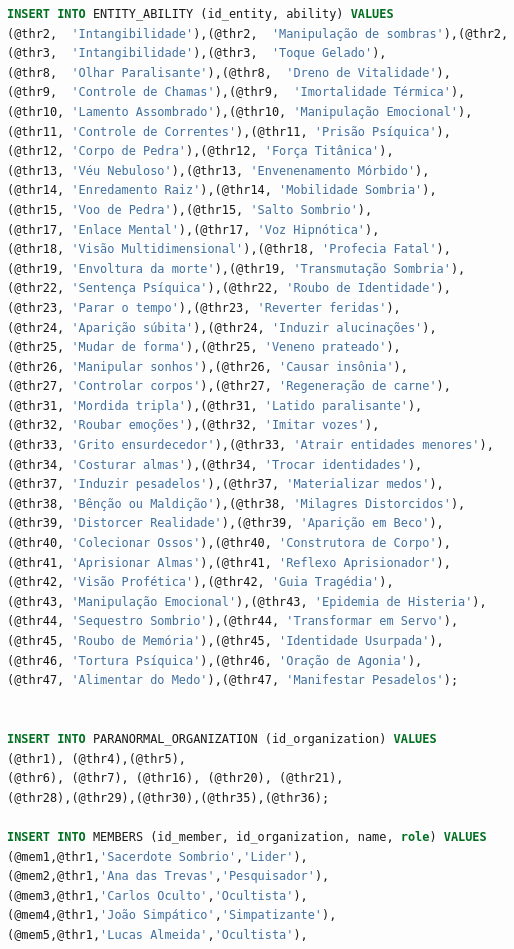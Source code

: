 \documentclass[12pt,a4paper]{report}
\begin{document}
\begin{lstlisting}[language=SQL, caption=population.sql]
INSERT INTO ENTITY_ABILITY (id_entity, ability) VALUES
(@thr2,  'Intangibilidade'),(@thr2,  'Manipulação de sombras'),(@thr2,  'Aura Sombria'),
(@thr3,  'Intangibilidade'),(@thr3,  'Toque Gelado'),
(@thr8,  'Olhar Paralisante'),(@thr8,  'Dreno de Vitalidade'),
(@thr9,  'Controle de Chamas'),(@thr9,  'Imortalidade Térmica'),
(@thr10, 'Lamento Assombrado'),(@thr10, 'Manipulação Emocional'),
(@thr11, 'Controle de Correntes'),(@thr11, 'Prisão Psíquica'),
(@thr12, 'Corpo de Pedra'),(@thr12, 'Força Titânica'),
(@thr13, 'Véu Nebuloso'),(@thr13, 'Envenenamento Mórbido'),
(@thr14, 'Enredamento Raiz'),(@thr14, 'Mobilidade Sombria'),
(@thr15, 'Voo de Pedra'),(@thr15, 'Salto Sombrio'),
(@thr17, 'Enlace Mental'),(@thr17, 'Voz Hipnótica'),
(@thr18, 'Visão Multidimensional'),(@thr18, 'Profecia Fatal'),
(@thr19, 'Envoltura da morte'),(@thr19, 'Transmutação Sombria'),
(@thr22, 'Sentença Psíquica'),(@thr22, 'Roubo de Identidade'),
(@thr23, 'Parar o tempo'),(@thr23, 'Reverter feridas'),
(@thr24, 'Aparição súbita'),(@thr24, 'Induzir alucinações'),
(@thr25, 'Mudar de forma'),(@thr25, 'Veneno prateado'),
(@thr26, 'Manipular sonhos'),(@thr26, 'Causar insônia'),
(@thr27, 'Controlar corpos'),(@thr27, 'Regeneração de carne'),
(@thr31, 'Mordida tripla'),(@thr31, 'Latido paralisante'),
(@thr32, 'Roubar emoções'),(@thr32, 'Imitar vozes'),
(@thr33, 'Grito ensurdecedor'),(@thr33, 'Atrair entidades menores'),
(@thr34, 'Costurar almas'),(@thr34, 'Trocar identidades'),
(@thr37, 'Induzir pesadelos'),(@thr37, 'Materializar medos'),
(@thr38, 'Bênção ou Maldição'),(@thr38, 'Milagres Distorcidos'),
(@thr39, 'Distorcer Realidade'),(@thr39, 'Aparição em Beco'),
(@thr40, 'Colecionar Ossos'),(@thr40, 'Construtora de Corpo'),
(@thr41, 'Aprisionar Almas'),(@thr41, 'Reflexo Aprisionador'),
(@thr42, 'Visão Profética'),(@thr42, 'Guia Tragédia'),
(@thr43, 'Manipulação Emocional'),(@thr43, 'Epidemia de Histeria'),
(@thr44, 'Sequestro Sombrio'),(@thr44, 'Transformar em Servo'),
(@thr45, 'Roubo de Memória'),(@thr45, 'Identidade Usurpada'),
(@thr46, 'Tortura Psíquica'),(@thr46, 'Oração de Agonia'),
(@thr47, 'Alimentar do Medo'),(@thr47, 'Manifestar Pesadelos');


INSERT INTO PARANORMAL_ORGANIZATION (id_organization) VALUES
(@thr1), (@thr4),(@thr5),
(@thr6), (@thr7), (@thr16), (@thr20), (@thr21),
(@thr28),(@thr29),(@thr30),(@thr35),(@thr36);

INSERT INTO MEMBERS (id_member, id_organization, name, role) VALUES
(@mem1,@thr1,'Sacerdote Sombrio','Lider'),
(@mem2,@thr1,'Ana das Trevas','Pesquisador'),
(@mem3,@thr1,'Carlos Oculto','Ocultista'),
(@mem4,@thr1,'João Simpático','Simpatizante'),
(@mem5,@thr1,'Lucas Almeida','Ocultista'),


\end{lstlisting}
\end{document}
